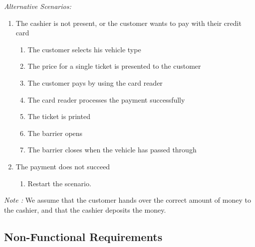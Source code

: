 \textit{Alternative Scenarios: }
\begin{enumerate}
	\item The cashier is not present, or the customer wants to pay with their credit card
		\begin{enumerate}
			\item The customer selects his vehicle type
			\item The price for a single ticket is presented to the customer
			\item The customer pays by using the card reader
			\item The card reader processes the payment successfully
			\item The ticket is printed
			\item The barrier opens
			\item The barrier closes when the vehicle has passed through
		\end{enumerate}
		
	\item The payment does not succeed
		\begin{enumerate}
			\item Restart the scenario.
		\end{enumerate}

 \end{enumerate} 
 
 \textit{Note :} We assume that the customer hands over the correct amount of money to the cashier, and that the cashier deposits the money.


\subsection{Non-Functional Requirements}